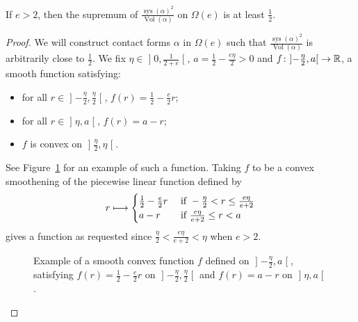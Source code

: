 \documentclass[AHL,Unicode,longabstracts]{cedram}
\DeclareMathOperator{\vol}{Vol}
\DeclareMathOperator{\sys}{sys}
\newcommand{\bbR}{\mathbb{R}}
\renewcommand*{\to}{\mathchoice{\longrightarrow}{\rightarrow}{\rightarrow}{\rightarrow}}
\let\oldmapsto\mapsto
\renewcommand*{\mapsto}{\mathchoice{\longmapsto}{\oldmapsto}{\oldmapsto}{\oldmapsto}}
\begin{document}
\begin{prop}\label{prop:optimal_constant}
If $e > 2$, then the supremum of $\frac{\sys(\alpha)^2}{\vol(\alpha)}$ on $\Omega(e)$ is at least $\frac{1}{2}$.
\end{prop}

\begin{proof}
We will construct contact forms $\alpha$ in $\Omega(e)$ such that $\frac{\sys(\alpha)^2}{\vol(\alpha)}$ is arbitrarily close to $\frac{1}{2}$. We fix $\eta \in\mathopen{]}0, \frac{1}{2+e}\mathclose{[}$, $a = \frac{1}{2} - \frac{e \eta}{2} > 0$ and $f \colon\mathopen{]}-\frac{\eta}{2}, a\mathclose{[}\to \bbR$, a smooth function satisfying:
\begin{itemize}
\item for all $r \in\mathopen{]}-\frac{\eta}{2}, \frac{\eta}{2}\mathclose{[}$, $f(r) = \frac{1}{2} - \frac{e}{2}r$;
\item for all $r \in\mathopen{]}\eta, a\mathclose{[}$, $f(r) = a - r$;
\item $f$ is convex on $\mathopen{]}\frac{\eta}{2}, \eta\mathclose{[}$.
\end{itemize}

See Figure~\ref{fig:interpolation} for an example of such a function. Taking $f$ to be a convex smoothening of the piecewise linear function defined by
\[
r \mapsto
\begin{cases}
\frac{1}{2} - \frac{e}{2}r &\text{ if } - \frac{\eta}{2} < r \leq \frac{e \eta}{e+2} \\
a - r &\text{ if } \frac{e \eta}{e+2} \leq r < a
\end{cases}
\]
gives a function as requested since $\frac{\eta}{2} < \frac{e \eta}{e+2} < \eta$ when $e > 2$.

\begin{figure}[!h]
\centering
{}
\caption{Example of a smooth convex function $f$ defined on $\mathopen{]}-\frac{\eta}{2}, a\mathclose{[}$, satisfying $f(r)=\frac{1}{2} - \frac{e}{2}r$ on
$\mathopen{]}-\frac{\eta}{2}, \frac{\eta}{2}\mathclose{[}$ and $f(r)=a-r$ on $\mathopen{]}\eta, a\mathclose{[}$.}
\label{fig:interpolation}
\end{figure}


\end{proof}
\end{document}
